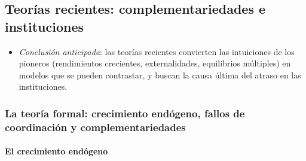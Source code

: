 \documentclass[11pt]{article}
\begin{document}
\subsection{Teorías recientes: complementariedades e instituciones}\label{sec:recientes}

\begin{itemize}
\item \emph{Conclusión anticipada}: las teorías recientes convierten las intuiciones de los pioneros (rendimientos crecientes, externalidades, equilibrios múltiples) en modelos que se pueden contrastar, y buscan la causa última del atraso en las instituciones.
\end{itemize}

\subsubsection{La teoría formal: crecimiento endógeno, fallos de coordinación y complementariedades}\label{sec:formal}


\paragraph{El crecimiento endógeno}
\end{document}
